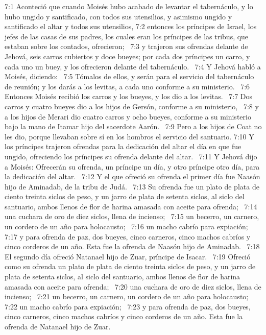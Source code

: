 7:1 Aconteció que cuando Moisés hubo acabado de levantar el tabernáculo, y lo hubo ungido y santificado, con todos sus utensilios, y asimismo ungido y santificado el altar y todos sus utensilios, 
7:2 entonces los príncipes de Israel, los jefes de las casas de sus padres, los cuales eran los príncipes de las tribus, que estaban sobre los contados, ofrecieron;  
7:3 y trajeron sus ofrendas delante de Jehová, seis carros cubiertos y doce bueyes; por cada dos príncipes un carro, y cada uno un buey, y los ofrecieron delante del tabernáculo.  
7:4 Y Jehová habló a Moisés, diciendo:  
7:5 Tómalos de ellos, y serán para el servicio del tabernáculo de reunión; y los darás a los levitas, a cada uno conforme a su ministerio.  
7:6 Entonces Moisés recibió los carros y los bueyes, y los dio a los levitas.  
7:7 Dos carros y cuatro bueyes dio a los hijos de Gersón, conforme a su ministerio,  
7:8 y a los hijos de Merari dio cuatro carros y ocho bueyes, conforme a su ministerio bajo la mano de Itamar hijo del sacerdote Aarón.  
7:9 Pero a los hijos de Coat no les dio, porque llevaban sobre sí en los hombros el servicio del santuario. 
7:10 Y los príncipes trajeron ofrendas para la dedicación del altar el día en que fue ungido, ofreciendo los príncipes su ofrenda delante del altar.  
7:11 Y Jehová dijo a Moisés: Ofrecerán su ofrenda, un príncipe un día, y otro príncipe otro día, para la dedicación del altar.  
7:12 Y el que ofreció su ofrenda el primer día fue Naasón hijo de Aminadab, de la tribu de Judá.  
7:13 Su ofrenda fue un plato de plata de ciento treinta siclos de peso, y un jarro de plata de setenta siclos, al siclo del santuario, ambos llenos de flor de harina amasada con aceite para ofrenda;  
7:14 una cuchara de oro de diez siclos, llena de incienso;  
7:15 un becerro, un carnero, un cordero de un año para holocausto;  
7:16 un macho cabrío para expiación;  
7:17 y para ofrenda de paz, dos bueyes, cinco carneros, cinco machos cabríos y cinco corderos de un año. Esta fue la ofrenda de Naasón hijo de Aminadab.  
7:18 El segundo día ofreció Natanael hijo de Zuar, príncipe de Isacar.  
7:19 Ofreció como su ofrenda un plato de plata de ciento treinta siclos de peso, y un jarro de plata de setenta siclos, al siclo del santuario, ambos llenos de flor de harina amasada con aceite para ofrenda;  
7:20 una cuchara de oro de diez siclos, llena de incienso;  
7:21 un becerro, un carnero, un cordero de un año para holocausto;  
7:22 un macho cabrío para expiación;  
7:23 y para ofrenda de paz, dos bueyes, cinco carneros, cinco machos cabríos y cinco corderos de un año. Esta fue la ofrenda de Natanael hijo de Zuar.  
